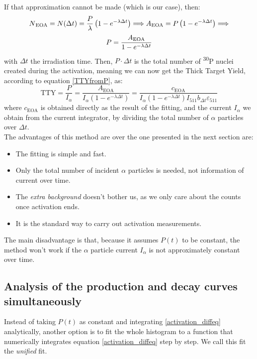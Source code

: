 \documentclass[a4paper,12pt]{report}
\newcommand{\Piso}{\textsuperscript{30}P }
\begin{document}
If that approximation cannot be made (which is our case), then:
\[ N\textsubscript{EOA} =N(\Delta t) = \frac{P}{\lambda} \left(1 - e^{-\lambda \Delta t} \right)\Longrightarrow A\textsubscript{EOA}=P\left(1-e^{-\lambda\Delta t}\right)\Longrightarrow \]
\begin{equation}
	P = \frac{A\textsubscript{EOA}}{1 - e^{-\lambda \Delta t}}
\end{equation}
with $\Delta t$ the irradiation time.
Then, $P\cdot\Delta t$ is the total number of \Piso nuclei created during the activation, meaning we can now get the Thick Target Yield, according to equation \ref{TTYfromP}, as:
\begin{equation}
	\text{TTY} = \frac{P}{I_\alpha} = \frac{A_\text{EOA}}{I_\alpha \left( 1-e^{-\lambda \Delta t}  \right)} =
	\frac{c_\text{EOA}}{I_\alpha \left( 1-e^{-\lambda \Delta t}  \right) I_{511} b_{\Delta t} \varepsilon_{511}  }
\end{equation}
where $c_\text{EOA}$ is obtained directly as the result of the fitting, and the current $I_\alpha$ we obtain from the current integrator, by dividing the total number of $\alpha$ particles over $\Delta t$.
\\

The advantages of this method are over the one presented in the next section are:
\begin{itemize}
	\item The fitting is simple and fast.
	\item Only the total number of incident $\alpha$ particles is needed, not information of current over time.
	\item The \textit{extra background} doesn't bother us, as we only care about the counts once activation ends.
	\item It is the standard way to carry out activation measurements.
\end{itemize}
The main disadvantage is that, because it assumes $P(t)$ to be constant, the method won't work if the $\alpha$ particle current $I_\alpha$ is not approximately constant over time.

\subsection{Analysis of the production and decay curves simultaneously}
Instead of taking $P(t)$ as constant and integrating \ref{activation_diffeq} analytically, another option is to fit the whole histogram to a function that numerically integrates equation \ref{activation_diffeq} step by step.
We call this fit the \textit{unified} fit.
\end{document}
